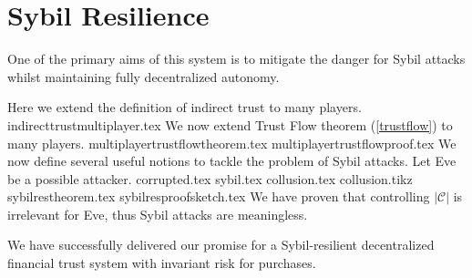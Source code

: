   \section{Sybil Resilience}
    One of the primary aims of this system is to mitigate the danger for Sybil attacks \cite{sybilattack} whilst maintaining
    fully decentralized autonomy.

    Here we extend the definition of indirect trust to many players.
    {indirecttrustmultiplayer.tex}
    We now extend Trust Flow theorem (\ref{trustflow}) to many players.
    {multiplayertrustflowtheorem.tex}
    {multiplayertrustflowproof.tex}
    We now define several useful notions to tackle the problem of Sybil attacks. Let Eve be a possible attacker.
    {corrupted.tex}
    {sybil.tex}
    {collusion.tex}
    {collusion.tikz}
    {sybilrestheorem.tex}
    {sybilresproofsketch.tex}
    We have proven that controlling $|\mathcal{C}|$ is irrelevant for Eve, thus Sybil attacks are meaningless.

    We have successfully delivered our promise for a Sybil-resilient decentralized financial trust system with
    invariant risk for purchases.

